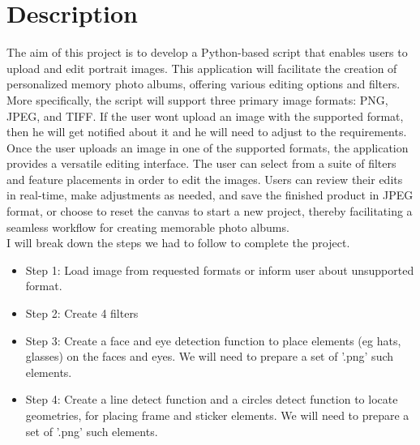 \section{Description}
The aim of this project is to develop a Python-based script that enables users to upload and edit portrait images. This application will facilitate the creation of personalized memory photo albums, offering various editing options and filters.\\

More specifically, the script will support three primary image formats: PNG, JPEG, and TIFF. If the user wont upload an image with the supported format, then he will get notified about it and he will need to adjust to the requirements.\\
Once the user uploads an image in one of the supported formats, the application provides a versatile editing interface. The user can select from a suite of filters and feature placements in order to edit the images. Users can review their edits in real-time, make adjustments as needed, and save the finished product in JPEG format, or choose to reset the canvas to start a new project, thereby facilitating a seamless workflow for creating memorable photo albums.\\

I will break down the steps we had to follow to complete the project.\\
\begin{itemize}
	\item Step 1: Load image from requested formats or inform user about unsupported format.\\
	
	\item Step 2: Create 4 filters\\
	
	\item Step 3: Create a face and eye detection function to place elements (eg hats, glasses) on the faces and eyes. We will need to prepare a set of '.png' such elements.\\
	
	\item Step 4: Create a line detect function and a circles detect function to locate geometries, for placing frame and sticker elements. We will need to prepare a set of '.png' such elements.
	
	
	
\end{itemize}

